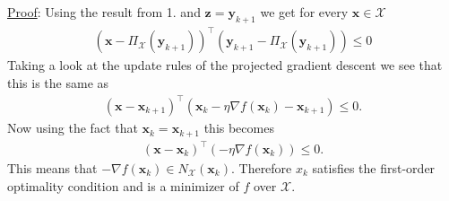 \documentclass{article}
\newcommand{\vect}[1]{\mathbf{#1}}
\newcommand{\Chi}{\mathcal{X}}
\newcommand{\xk}{\vect{x}_k}
\newcommand{\xkk}{\vect{x}_{k+1}}
\begin{document}
{\begin{enumerate}
\underline{Proof}: Using the result from 1. and $\vect{z}=\vect{y}_{k+1}$ we get for every $\vect{x}\in\Chi$
\begin{align*}
(\vect{x} - \Pi_\Chi(\vect{y}_{k+1}))^\top(\vect{y}_{k+1} - \Pi_\Chi(\vect{y}_{k+1}))\leq 0
\end{align*}
Taking a look at the update rules of the projected gradient descent we see that this is the same as
\begin{align*}
(\vect{x} - \xkk)^\top(\xk - \eta\nabla f(\xk) - \xkk)\leq 0.
\end{align*}
Now using the fact that $\xk = \xkk$ this becomes
\begin{align*}
(\vect{x} - \xk)^\top(- \eta\nabla f(\xk) )\leq 0.
\end{align*}
This means that $-\nabla f(\xk) \in N_\Chi(\xk)$. Therefore $x_k$ satisfies the first-order optimality condition and is a minimizer of $f$ over $\Chi$.

\end{enumerate}
}
\end{document}
